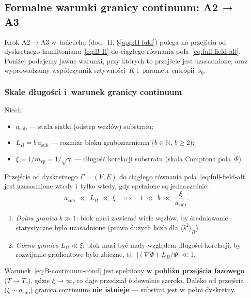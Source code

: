 \subsection{Formalne warunki granicy continuum: A2\,$\to$\,A3}%
\label{app:B-continuum}

Krok A2$\to$A3 w~\l{}a\'ncuchu (dod.~H, \S\ref{app:H-luki}) polega
na przej\'sciu od dyskretnego hamiltonianu~\eqref{eq:B-H}
do ci\k{a}g\l{}ego r\'ownania pola~\eqref{eq:full-field-alt}.
Poni\.zej podajemy jawne warunki, przy kt\'orych to przej\'scie
jest uzasadnione, oraz wyprowadzamy wsp\'o\l{}czynnik
sztywno\'sci~$K$ i~parametr entropii~$s_0$.

\subsubsection{Skale d\l{}ugo\'sci i~warunek granicy
  continuum}\label{app:B-scales}

Niech:
\begin{itemize}[nosep]
  \item $a_{\mathrm{sub}}$ --- sta\l{}a siatki (odst\k{e}p
    w\k{e}z\l{}\'ow) substratu;
  \item $L_B = b\,a_{\mathrm{sub}}$ --- rozmiar bloku
    gruboziarnienia ($b \in \mathbb{N}$, $b \geq 2$);
  \item $\xi = 1/m_{\mathrm{sp}} = 1/\sqrt{\gamma}$ ---
    d\l{}ugo\'s\'c korelacji substratu (skala Comptona pola~$\Phi$).
\end{itemize}

\begin{proposition}%
\label{prop:continuum-conditions}
Przej\'scie od dyskretnego $\Gamma = (V, E)$ do ci\k{a}g\l{}ego
r\'ownania pola~\eqref{eq:full-field-alt} jest uzasadnione
wtedy i~tylko wtedy, gdy spe\l{}nione s\k{a} jednocze\'snie:
\begin{equation}\label{eq:B-continuum-cond}
  \boxed{
    a_{\mathrm{sub}} \;\ll\; L_B \;\ll\; \xi
    \quad\Longleftrightarrow\quad
    1 \;\ll\; b \;\ll\; \frac{\xi}{a_{\mathrm{sub}}}.
  }
\end{equation}
\begin{enumerate}[nosep,label=(\roman*)]
  \item \emph{Dolna granica} $b \gg 1$: blok musi zawiera\'c
    wiele w\k{e}z\l{}\'ow, by \'sredniowanie statystyczne
    by\l{}o uzasadnione (prawo du\.zych liczb dla
    $\langle\hat{s}^2\rangle_B$).
  \item \emph{G\'orna granica} $L_B \ll \xi$: blok musi
    by\'c ma\l{}y wzgl\k{e}dem d\l{}ugo\'sci korelacji,
    by rozwijanie gradientowe by\l{}o zbiezne, tj.\
    $|(\nabla\Phi)\,L_B / \Phi| \ll 1$.
\end{enumerate}
Warunek~\eqref{eq:B-continuum-cond} jest spe\l{}niony
\textbf{w pobli\.zu przej\'scia fazowego} ($T \to T_c$),
gdzie $\xi \to \infty$, co daje przedzia\l{} $b$ dowolnie szeroki.
Daleko od przej\'scia ($\xi \sim a_{\mathrm{sub}}$) granica
continuum \textbf{nie istnieje} --- substrat jest w~pe\l{}ni
dyskretny.
\end{proposition}


